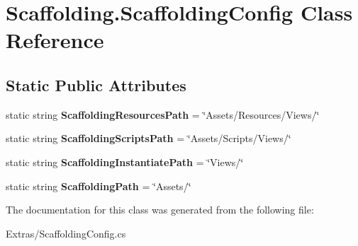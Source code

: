 \hypertarget{class_scaffolding_1_1_scaffolding_config}{\section{Scaffolding.\-Scaffolding\-Config Class Reference}
\label{class_scaffolding_1_1_scaffolding_config}
}
\subsection*{Static Public Attributes}
\begin{DoxyCompactItemize}
\item 
\hypertarget{class_scaffolding_1_1_scaffolding_config_a9509e163f79e9cd9fc66b571f47af5c6}{static string {\bfseries Scaffolding\-Resources\-Path} = \char`\"{}Assets/Resources/Views/\char`\"{}}\label{class_scaffolding_1_1_scaffolding_config_a9509e163f79e9cd9fc66b571f47af5c6}

\item 
\hypertarget{class_scaffolding_1_1_scaffolding_config_af399dc5b33f5bba471e5caf13b1eeda1}{static string {\bfseries Scaffolding\-Scripts\-Path} = \char`\"{}Assets/Scripts/Views/\char`\"{}}\label{class_scaffolding_1_1_scaffolding_config_af399dc5b33f5bba471e5caf13b1eeda1}

\item 
\hypertarget{class_scaffolding_1_1_scaffolding_config_a22bd85373e437aab80656173c4c5a3b0}{static string {\bfseries Scaffolding\-Instantiate\-Path} = \char`\"{}Views/\char`\"{}}\label{class_scaffolding_1_1_scaffolding_config_a22bd85373e437aab80656173c4c5a3b0}

\item 
\hypertarget{class_scaffolding_1_1_scaffolding_config_ab77a584978da96b9bed8ee5bcf7884aa}{static string {\bfseries Scaffolding\-Path} = \char`\"{}Assets/\char`\"{}}\label{class_scaffolding_1_1_scaffolding_config_ab77a584978da96b9bed8ee5bcf7884aa}

\end{DoxyCompactItemize}


The documentation for this class was generated from the following file\-:\begin{DoxyCompactItemize}
\item 
Extras/Scaffolding\-Config.\-cs\end{DoxyCompactItemize}

